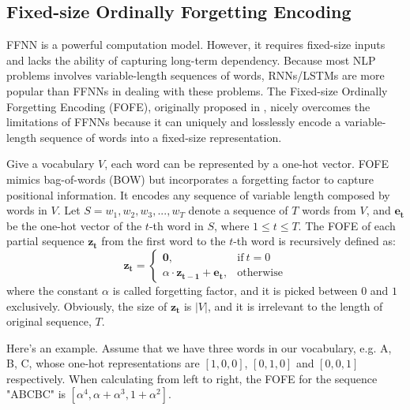 \documentclass[11pt,a4paper]{article}
\begin{document}
\subsection{Fixed-size Ordinally Forgetting Encoding}

FFNN is a powerful computation model. 
However, it requires fixed-size inputs and 
lacks the ability of capturing long-term dependency. 
Because most NLP problems involves variable-length sequences of words, 
RNNs/LSTMs are more popular than FFNNs in dealing with these problems. 
The Fixed-size Ordinally Forgetting Encoding (FOFE), 
originally proposed in \cite{zhang2015fixed}, nicely overcomes the limitations of FFNNs because it 
can uniquely and losslessly encode a variable-length sequence of words into a fixed-size representation. 

Give a vocabulary $V$, each word can be represented by a one-hot vector. 
FOFE mimics bag-of-words (BOW) but incorporates a forgetting factor to capture positional information.
It encodes any sequence of variable length composed by words in $V$. 
Let $S = {w_1, w_2, w_3, ... , w_T}$ denote a sequence of $T$ words from $V$, 
and $\bm{e_t}$ be the one-hot vector of the $t$-th word in $S$, where $1 \leq t \leq T$.
The FOFE of each partial sequence $\bm{z_t}$ from the first word to the $t$-th word is recursively defined as:
\begin{equation}
\bm{z_t}=
\begin{cases}
\bm{0}, & \text{if}\ t = 0 \\
\alpha \cdot \bm{z_{t - 1}} + \bm{e_t}, & \text{otherwise}
\end{cases}  \label{eq_FOFE_formula}
\end{equation}
where the constant $\alpha$ is called forgetting factor, and it is picked between $0$ and $1$ exclusively. 
Obviously, the size of $\bm{z_t}$ is $|V|$, and it is irrelevant to the length of original sequence, $T$.

Here's an example. Assume that we have three words in our vocabulary, e.g. A, B, C, 
whose one-hot representations are $[1, 0, 0]$, $[0, 1, 0]$ and $[0, 0, 1]$ respectively. 
When calculating from left to right, the FOFE for the sequence 
"ABCBC" is $[{\alpha}^4, {\alpha} + {\alpha}^3, 1 + {\alpha}^2]$.
\end{document}
